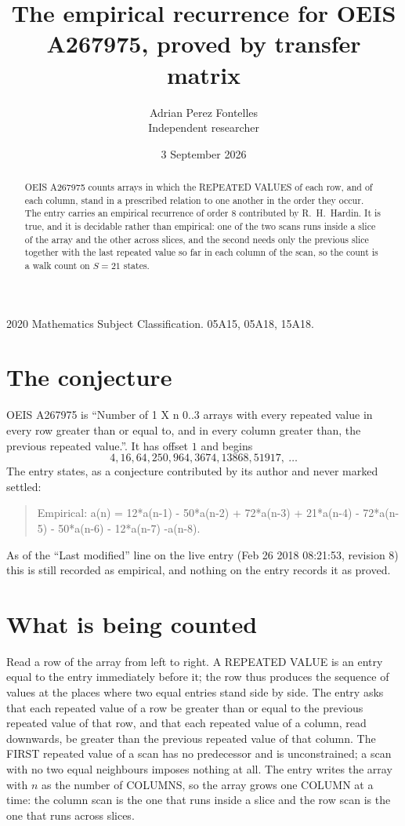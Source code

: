 \documentclass[11pt,a4paper]{article}
\title{The empirical recurrence for OEIS A267975, proved by transfer matrix}
\author{Adrian Perez Fontelles\\ \small Independent researcher}
\date{3 September 2026}
\theoremstyle{plain}
\theoremstyle{definition}
\begin{document}
\maketitle

\begin{abstract}
OEIS A267975 counts arrays in which the REPEATED VALUES of each row, and of each column, stand in a
prescribed relation to one another in the order they occur. The entry carries an empirical
recurrence of order $8$ contributed by R.~H.~Hardin. It is true, and it is decidable
rather than empirical: one of the two scans runs inside a slice of the array and the other
across slices, and the second needs only the previous slice together with the last repeated
value so far in each column of the scan, so the count is a walk count on $S=21$ states.
\end{abstract}

\noindent\small 2020 Mathematics Subject Classification. 05A15, 05A18, 15A18.\normalsize

\section{The conjecture}

OEIS A267975 is ``Number of 1 X n 0..3 arrays with every repeated value in every row greater than or equal to, and in every column greater than, the previous repeated value.''. It has offset $1$ and begins
\[
4, 16, 64, 250, 964, 3674, 13868, 51917,\ \dots
\]
The entry states, as a conjecture contributed by its author and never marked settled:
\begin{quote}
Empirical: a(n) = 12*a(n-1) - 50*a(n-2) + 72*a(n-3) + 21*a(n-4) - 72*a(n-5) - 50*a(n-6) - 12*a(n-7) -a(n-8).
\end{quote}
As of the ``Last modified'' line on the live entry (Feb 26 2018 08:21:53, revision 8) this is still
recorded as empirical, and nothing on the entry records it as proved.

\section{What is being counted}

Read a row of the array from left to right. A REPEATED VALUE is an entry equal to the entry
immediately before it; the row thus produces the sequence of values at the places where two
equal entries stand side by side. The entry asks that each repeated value of a row be
greater than or equal to the previous repeated value of that row, and that each repeated value of a column,
read downwards, be greater than the previous repeated value of that column. The FIRST repeated
value of a scan has no predecessor and is unconstrained; a scan with no two equal neighbours
imposes nothing at all. The entry writes the array with $n$ as the number of COLUMNS, so the array grows one COLUMN at a time: the column scan is the one that runs inside a slice and the row scan is the one that runs across slices.
\end{document}

